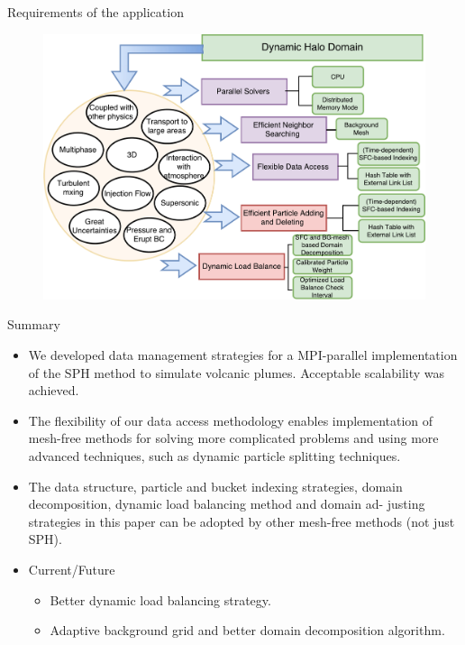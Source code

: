 \documentclass{beamer}
\begin{document}
\begin{frame}{Requirements of the application}
\begin{figure}[!t]
\centering
\includegraphics[scale=0.35]{Requirement_all}
\label{fig:Requirements}
\end{figure}
\end{frame}

\begin{frame}{Summary}
  \begin{itemize}
  \item
    We developed data management strategies for a MPI-parallel implementation of the SPH
method to simulate volcanic plumes. Acceptable scalability was achieved.
  \item
    The flexibility of our data access methodology enables implementation of  mesh-free methods for
solving more complicated problems and using more advanced techniques, such as dynamic particle splitting techniques.
  \item
    The data structure, particle and bucket
indexing strategies, domain decomposition, dynamic load balancing method and domain ad-
justing strategies in this paper can be adopted by other mesh-free methods (not just SPH).
  \end{itemize}
  
  \begin{itemize}
  \item
    Current/Future
    \begin{itemize}
    \item
      Better dynamic load balancing strategy.
    \item
      Adaptive background grid and better domain decomposition algorithm.
    \end{itemize}
  \end{itemize}
\end{frame}
\end{document}
